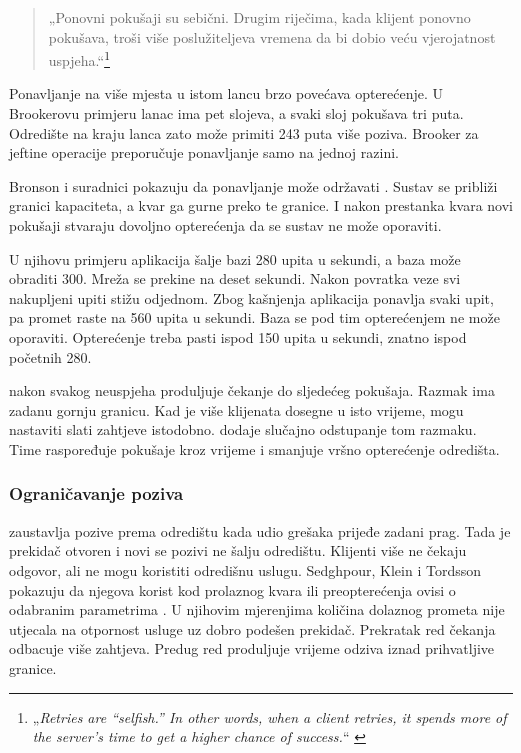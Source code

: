 \begin{quote}
„Ponovni pokušaji su sebični. Drugim riječima, kada klijent ponovno
pokušava, troši više poslužiteljeva vremena da bi dobio veću vjerojatnost
uspjeha.“\footnote{„\emph{Retries are “selfish.” In other words, when a
client retries, it spends more of the server's time to get a higher chance
of success.}“ \cite{brookertimeouts}} \end{quote}

Ponavljanje na više mjesta u istom lancu brzo povećava opterećenje. U
Brookerovu primjeru lanac ima pet slojeva, a svaki sloj pokušava tri puta.
Odredište na kraju lanca zato može primiti 243 puta više poziva. Brooker za
jeftine operacije preporučuje ponavljanje samo na jednoj razini.

Bronson i suradnici pokazuju da ponavljanje može održavati
\cite{bronson2021metastable}. Sustav se približi granici kapaciteta, a kvar
ga gurne preko te granice. I nakon prestanka kvara novi pokušaji stvaraju
dovoljno opterećenja da se sustav ne može oporaviti.

U njihovu primjeru aplikacija šalje bazi 280 upita u sekundi, a baza može
obraditi 300. Mreža se prekine na deset sekundi. Nakon povratka veze svi
nakupljeni upiti stižu odjednom. Zbog kašnjenja aplikacija ponavlja svaki
upit, pa promet raste na 560 upita u sekundi. Baza se pod tim opterećenjem
ne može oporaviti. Opterećenje treba pasti ispod 150 upita u sekundi,
znatno ispod početnih 280.

 nakon svakog
neuspjeha produljuje čekanje do sljedećeg pokušaja. Razmak ima zadanu gornju
granicu. Kad je više klijenata dosegne u isto vrijeme, mogu nastaviti
slati zahtjeve istodobno.  dodaje slučajno
odstupanje tom razmaku. Time raspoređuje pokušaje kroz vrijeme i smanjuje
vršno opterećenje odredišta.

\subsubsection*{Ograničavanje poziva}

 zaustavlja pozive prema odredištu kada
udio grešaka prijeđe zadani prag. Tada je prekidač otvoren i novi se pozivi
ne šalju odredištu. Klijenti više ne čekaju odgovor, ali ne mogu koristiti
odredišnu uslugu.
Sedghpour, Klein i Tordsson pokazuju da njegova korist
kod prolaznog kvara ili preopterećenja ovisi o odabranim
parametrima \cite{sedghpour2022empirical}. U njihovim mjerenjima količina
dolaznog prometa nije utjecala na otpornost usluge uz dobro podešen prekidač.
Prekratak red čekanja odbacuje više zahtjeva. Predug red produljuje vrijeme
odziva iznad prihvatljive granice.


